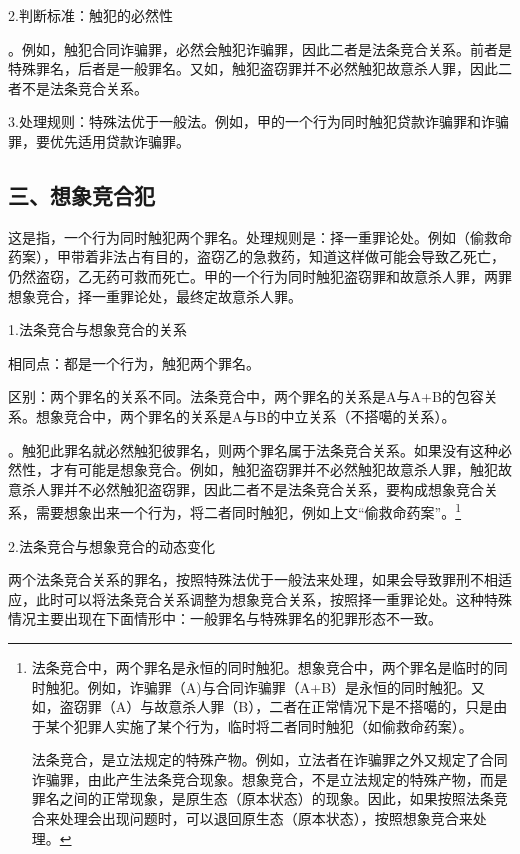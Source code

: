 2.判断标准：触犯的必然性

。例如，触犯合同诈骗罪，必然会触犯诈骗罪，因此二者是法条竞合关系。前者是特殊罪名，后者是一般罪名。又如，触犯盗窃罪并不必然触犯故意杀人罪，因此二者不是法条竞合关系。

3.处理规则：特殊法优于一般法。例如，甲的一个行为同时触犯贷款诈骗罪和诈骗罪，要优先适用贷款诈骗罪。

\subsection*{三、想象竞合犯}

这是指，一个行为同时触犯两个罪名。处理规则是：择一重罪论处。例如（偷救命药案），甲带着非法占有目的，盗窃乙的急救药，知道这样做可能会导致乙死亡，仍然盗窃，乙无药可救而死亡。甲的一个行为同时触犯盗窃罪和故意杀人罪，两罪想象竞合，择一重罪论处，最终定故意杀人罪。

1.法条竞合与想象竞合的关系

相同点：都是一个行为，触犯两个罪名。

区别：两个罪名的关系不同。法条竞合中，两个罪名的关系是A与A+B的包容关系。想象竞合中，两个罪名的关系是A与B的中立关系（不搭噶的关系）。

。触犯此罪名就必然触犯彼罪名，则两个罪名属于法条竞合关系。如果没有这种必然性，才有可能是想象竞合。例如，触犯盗窃罪并不必然触犯故意杀人罪，触犯故意杀人罪并不必然触犯盗窃罪，因此二者不是法条竞合关系，要构成想象竞合关系，需要想象出来一个行为，将二者同时触犯，例如上文“偷救命药案”。\footnote{法条竞合中，两个罪名是永恒的同时触犯。想象竞合中，两个罪名是临时的同时触犯。例如，诈骗罪（A)与合同诈骗罪（A+B）是永恒的同时触犯。又如，盗窃罪（A）与故意杀人罪（B），二者在正常情况下是不搭噶的，只是由于某个犯罪人实施了某个行为，临时将二者同时触犯（如偷救命药案）。

法条竞合，是立法规定的特殊产物。例如，立法者在诈骗罪之外又规定了合同诈骗罪，由此产生法条竞合现象。想象竞合，不是立法规定的特殊产物，而是罪名之间的正常现象，是原生态（原本状态）的现象。因此，如果按照法条竞合来处理会出现问题时，可以退回原生态（原本状态），按照想象竞合来处理。}

2.法条竞合与想象竞合的动态变化

两个法条竞合关系的罪名，按照特殊法优于一般法来处理，如果会导致罪刑不相适应，此时可以将法条竞合关系调整为想象竞合关系，按照择一重罪论处。这种特殊情况主要出现在下面情形中：一般罪名与特殊罪名的犯罪形态不一致。

